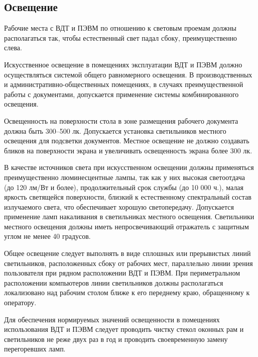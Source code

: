 \subsection{Освещение}
\label{sec:bgd:lighting}
Рабочие места с ВДТ и ПЭВМ по отношению к световым проемам должны располагаться так, чтобы естественный свет падал сбоку, преимущественно слева.

Искусственное освещение в помещениях эксплуатации ВДТ и ПЭВМ должно осуществляться системой общего равномерного освещения. В производственных и административно-общественных помещениях, в случаях преимущественной работы с документами, допускается применение системы комбинированного освещения.

Освещенность на поверхности стола в зоне размещения рабочего документа должна быть 300--500 лк. Допускается установка светильников местного освещения для подсветки документов. Местное освещение не должно создавать бликов на поверхности экрана и увеличивать освещенность экрана более 300 лк.

В качестве источников света при искусственном освещении должны применяться преимущественно люминесцентные лампы, так как у них высокая светоотдача (до 120 лм/Вт и более), продолжительный срок службы (до 10 000 ч.), малая яркость светящейся поверхности, близкий к естественному спектральный состав излучаемого света, что обеспечивает хорошую светопередачу. Допускается применение ламп накаливания в светильниках местного освещения. Светильники местного освещения должны иметь непросвечивающий отражатель с защитным углом не менее 40 градусов.

Общее освещение следует выполнять в виде сплошных или прерывистых линий светильников, расположенных сбоку от рабочих мест, параллельно линии зрения пользователя при рядном расположении ВДТ и ПЭВМ. При периметральном расположении компьютеров линии светильников должны располагаться локализовано над рабочим столом ближе к его переднему краю, обращенному к оператору.

Для обеспечения нормируемых значений освещенности в помещениях использования ВДТ и ПЭВМ следует проводить чистку стекол оконных рам и светильников не реже двух раз в год и проводить своевременную замену перегоревших ламп.


